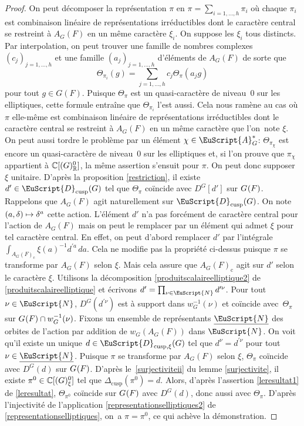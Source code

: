 \documentclass[JEP,XML,SOM,Unicode,francais]{cedram}
\let\mathcal \EuScript
\newcommand{\NoChangel}[1]{%
\expandafter\let\csname old\string#1\endcsname=#1
\let#1=\relax
\newcommand{#1}{\mathcode`l="716C\csname old\string#1\endcsname\mathcode`l="7160 }%
}
\newcommand\mto{\mathchoice{\longmapsto}{\mapsto}{\mapsto}{\mapsto}}
\newcommand{\rc}{\mathrm{c}}
\newcommand{\cusp}{\mathrm{cusp}}
\newcommand{\rell}{\mathrm{ell}} \NoChangel{\rell}
\newcommand{\Ell}{\mathrm{Ell}} \NoChangel{\Ell}
\newcommand{\cA}{\mathcal{A}}
\newcommand{\cD}{\mathcal{D}}
\newcommand{\cN}{\mathcal{N}}
\newcommand{\CC}{\mathbb{C}}
\newcommand{\RR}{\mathbb{R}}
\theoremstyle{plain}
\theoremstyle{definition}
\begin{document}
\begin{proof}
On peut décomposer la représentation $\pi$ en $\pi=\sum_{i=1,\dots,h}\pi_{i}$ où chaque $\pi_{i}$ est combinaison linéaire de représentations irréductibles dont le caractère central se restreint à $A_{G}(F)$ en un même caractère $\xi_{i}$. On suppose les $\xi_{i}$ tous distincts. Par interpolation, on peut trouver une famille de nombres complexes $(c_{j})_{j=1,\dots,h}$ et une famille $(a_{j})_{j=1,\dots,h}$ d'éléments de $A_{G}(F)$ de sorte que
\[
\Theta_{\pi_{i}}(g)=\sum_{j=1,\dots,h}c_{j}\Theta_{\pi}(a_{j}g)
\]
pour tout $g\in G(F)$. Puisque $\Theta_{\pi}$ est un quasi-caractère de niveau~$0$ sur les elliptiques, cette formule entraîne que $\Theta_{\pi_{i}}$ l'est aussi. Cela nous ramène au cas où $\pi$ elle-même est combinaison linéaire de représentations irréductibles dont le caractère central se restreint à $A_{G}(F)$ en un même caractère que l'on~note $\xi$. On peut aussi tordre le problème par un élément $\chi\in \cA_{G}^*$: $\Theta_{\pi_{\chi}}$ est encore un quasi-caractère de niveau~$0$ sur les elliptiques et, si l'on prouve que $\pi_{\chi}$ appartient à
$\CC[\Ell(G)^0_{\RR}]$, la même assertion s'ensuit pour $\pi$. On peut donc supposer $\xi$ unitaire. D'après la proposition \ref{restriction}, il existe $d'\in \cD_{\cusp}(G)$ tel que $\Theta_{\pi}$ coïncide avec $D^G[d']$ sur $G_{\rell}(F)$. Rappelons que $A_{G}(F)$ agit naturellement sur $\cD_{\cusp}(G)$. On note $(a,\delta)\mto \delta^{a}$ cette action.
L'élément $d'$ n'a pas forcément de caractère central pour l'action de $A_{G}(F)$ mais on peut le remplacer par un élément qui admet $\xi$ pour tel caractère central. En effet, on peut d'abord remplacer $d'$ par l'intégrale $\int_{A_{G}(F)_{\rc}}\xi(a)^{-1}d^{\prime a} \,da$. Cela ne modifie pas la propriété ci-dessus puisque $\pi$ se transforme par $A_{G}(F)$ selon $\xi$. Mais cela assure que $A_{G}(F)_{\rc}$ agit sur $d'$ selon le caractère $\xi$.
Utilisons la décomposition \eqref{produitscalaireelliptique2} de \ref{produitscalaireelliptique} et écrivons $d'=\prod_{\nu\in \cN}d^{\prime\nu}$. Pour tout $\nu\in \cN$, $D^G(d^{\prime\nu})$ est à support dans $w_{G}^{-1}(\nu)$ et coïncide avec~$\Theta_{\pi}$ sur $G_{\rell}(F)\cap w_{G}^{-1}(\nu)$.
Fixons un ensemble de représentants $\underline{\cN}$ des orbites de l'action par addition de $w_{G}(A_{G}(F))$ dans $\cN$. On voit qu'il existe un unique $ d\in \cD_{\cusp,\xi}(G)$ tel que $ d^{\nu}=d^{\prime\nu}$ pour tout $\nu\in \underline{\cN}$. Puisque $\pi$ se transforme par $A_{G}(F)$ selon $\xi$, $\Theta_{\pi}$ coïncide avec $D^G(d)$ sur $G_{\rell}(F)$. D'après le~\eqref{surjectiviteii} du lemme \ref{surjectivite}, il existe $\pi^0\in \CC[\Ell(G)_{\xi}^0]$ tel que $\Delta_{\cusp}(\pi^0)=d$. Alors, d'après l'assertion \eqref{leresultat1} de \ref{leresultat}, $\Theta_{\pi^0}$ coïncide sur $G_{\rell}(F)$ avec $D^G(d)$, donc aussi avec $\Theta_{\pi}$. D'après l'injectivité de l'application \eqref{representationselliptiques2} de \ref{representationselliptiques}, on~a $\pi=\pi^0$, ce qui achève la démonstration.
\end{proof}
\end{document}
